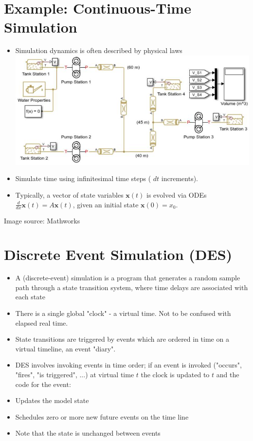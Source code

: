 \documentclass[10pt]{article}
\begin{document}
\section*{Example: Continuous-Time Simulation}
\begin{itemize}
  \item Simulation dynamics is often described by physical laws\\
\includegraphics[max width=\textwidth, center]{2025_05_12_520db7cd238ba7b44f0fg-05}
  \item Simulate time using infinitesimal time steps ( $d t$ increments).
  \item Typically, a vector of state variables $\mathbf{x}(t)$ is evolved via ODEs $\frac{d}{d x} \mathbf{x}(t)=A \mathbf{x}(t)$, given an initial state $\mathbf{x}(0)=x_{0}$.
\end{itemize}

Image source: Mathworks

\section*{Discrete Event Simulation (DES)}
\begin{itemize}
  \item A (discrete-event) simulation is a program that generates a random sample path through a state transition system, where time delays are associated with each state
  \item There is a single global "clock" - a virtual time. Not to be confused with elapsed real time.
  \item State transitions are triggered by events which are ordered in time on a virtual timeline, an event "diary".
  \item DES involves invoking events in time order; if an event is invoked ("occurs", "fires", "is triggered", ...) at virtual time $t$ the clock is updated to $t$ and the code for the event:
  \item Updates the model state
  \item Schedules zero or more new future events on the time line
  \item Note that the state is unchanged between events
\end{itemize}
\end{document}

